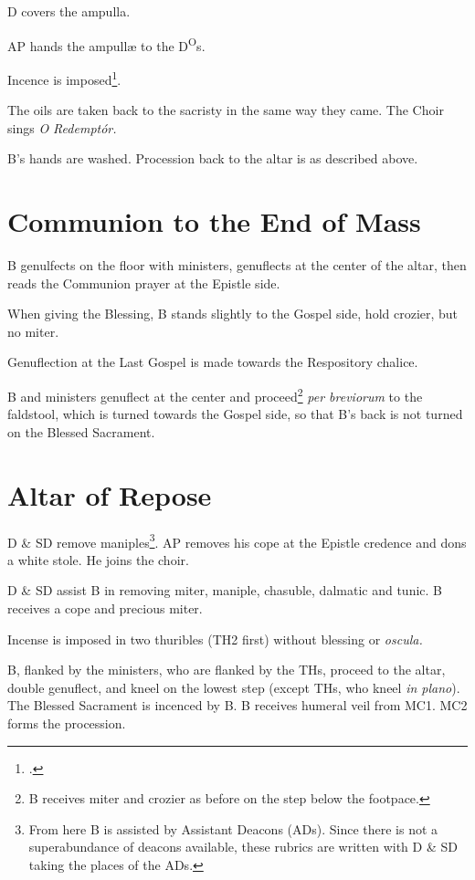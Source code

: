 {\rubric D covers the ampulla.

\rubric AP hands the ampullæ to the D\textsuperscript{O}s.

\rubric Incence is imposed\footcite[It appears that B does not need to impose
this incense, but it can be done by MC1 or MC2 or by TH himself.][p.
190]{stehle}.

\rubric The oils are taken back to the sacristy in the same way they came. The
Choir sings \textit{O Redemptór.}

\rubric B's hands are washed. Procession back to the altar is as described
above.

\section{Communion to the End of Mass}

\rubric B genulfects on the floor with ministers, genuflects at the center of
the altar, then reads the Communion prayer at the Epistle side.

\rubric When giving the Blessing, B stands slightly to the Gospel side, hold
crozier, but no miter.

\rubric Genuflection at the Last Gospel is made towards the Respository
chalice.

\rubric B and ministers genuflect at the center and proceed\footnote{B receives
miter and crozier as before on the step below the footpace.} \textit{per
breviorum} to the faldstool, which is turned towards the Gospel side, so that
B's back is not turned on the Blessed Sacrament.

\section{Altar of Repose}

\rubric D \& SD remove maniples\footnote{From here B is assisted by Assistant
Deacons (ADs). Since there is not a superabundance of deacons available, these
rubrics are written with D \& SD taking the places of the ADs.}. AP removes his
cope at the Epistle credence and dons a white stole. He joins the choir.

\rubric D \& SD assist B in removing miter, maniple, chasuble, dalmatic and
tunic. B receives a cope and precious miter.

\rubric Incense is imposed in two thuribles (TH2 first) without blessing or
\textit{oscula.}

\rubric B, flanked by the ministers, who are flanked by the THs, proceed to the
altar, double genuflect, and kneel on the lowest step (except THs, who kneel
\textit{in plano}). The Blessed Sacrament is incenced by B. B receives humeral
veil from MC1. MC2 forms the procession.

}
